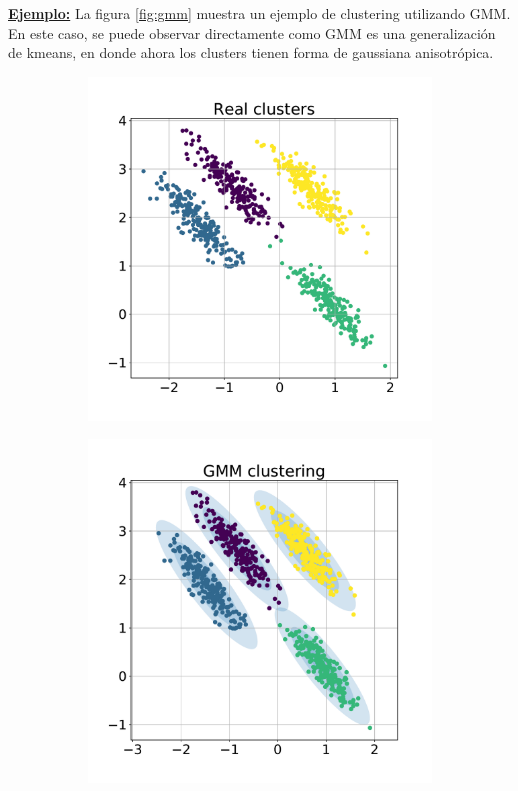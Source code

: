 \underline{\textbf{Ejemplo:}} La figura \ref{fig:gmm} muestra un ejemplo de clustering utilizando GMM. En este caso, se puede observar directamente como GMM es una generalización de kmeans, en donde ahora los clusters tienen forma de gaussiana anisotrópica.

\begin{figure}[ht]
    \centering
    \begin{subfigure}[t]{0.5\linewidth}
        \centering
        \includegraphics[width=\linewidth]{img/real_clusters.pdf}
        \caption{}
    \end{subfigure}%
    \begin{subfigure}[t]{0.5\linewidth}
        \centering
        \includegraphics[width=\linewidth]{img/gmm.pdf}

\end{subfigure}
\end{figure}
